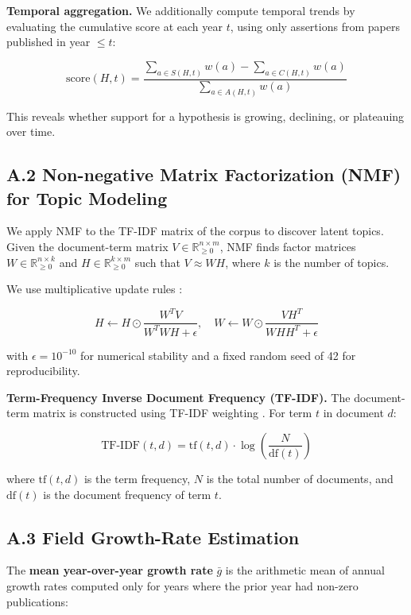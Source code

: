 \documentclass[
]{article}
\begin{document}
\textbf{Temporal aggregation.} We additionally compute temporal trends
by evaluating the cumulative score at each year \(t\), using only
assertions from papers published in year \(\leq t\):

\[
\text{score}(H, t) = \frac{\sum_{a \in S(H,t)} w(a) - \sum_{a \in C(H,t)} w(a)}{\sum_{a \in A(H,t)} w(a)}
\]

This reveals whether support for a hypothesis is growing, declining, or
plateauing over time.

\subsection{A.2 Non-negative Matrix Factorization (NMF) for Topic
Modeling}\label{a.2-non-negative-matrix-factorization-nmf-for-topic-modeling}

We apply NMF to the TF-IDF matrix of the corpus to discover latent
topics. Given the document-term matrix
\(V \in \mathbb{R}^{n \times m}_{\geq 0}\), NMF finds factor matrices
\(W \in \mathbb{R}^{n \times k}_{\geq 0}\) and
\(H \in \mathbb{R}^{k \times m}_{\geq 0}\) such that \(V \approx WH\),
where \(k\) is the number of topics.

We use multiplicative update rules \citep{lee1999nmf}:

\[H \leftarrow H \odot \frac{W^T V}{W^T W H + \epsilon}, \quad W \leftarrow W \odot \frac{V H^T}{W H H^T + \epsilon}\]

with \(\epsilon = 10^{-10}\) for numerical stability and a fixed random
seed of 42 for reproducibility.

\textbf{Term-Frequency Inverse Document Frequency (TF-IDF).} The
document-term matrix is constructed using TF-IDF weighting
\citep{salton1975vector}. For term \(t\) in document \(d\):

\[
\text{TF-IDF}(t, d) = \text{tf}(t, d) \cdot \log\!\left(\frac{N}{\text{df}(t)}\right)
\]

where \(\text{tf}(t, d)\) is the term frequency, \(N\) is the total
number of documents, and \(\text{df}(t)\) is the document frequency of
term \(t\).

\subsection{A.3 Field Growth-Rate
Estimation}\label{a.3-field-growth-rate-estimation}

The \textbf{mean year-over-year growth rate} \(\bar{g}\) is the
arithmetic mean of annual growth rates computed only for years where the
prior year had non-zero publications:
\end{document}
